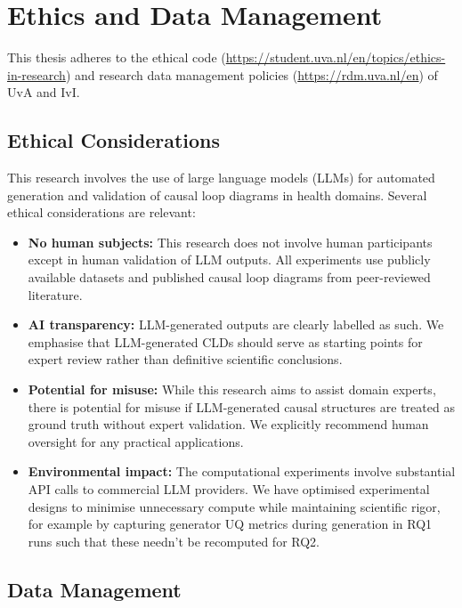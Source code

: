\chapter{Ethics and Data Management}
\label{ch:ethics}

This thesis adheres to the ethical code (\url{https://student.uva.nl/en/topics/ethics-in-research}) and research data management policies (\url{https://rdm.uva.nl/en}) of UvA and IvI.

\section{Ethical Considerations}

This research involves the use of large language models (LLMs) for automated generation and validation of causal loop diagrams in health domains. Several ethical considerations are relevant:

\begin{itemize}
    \item \textbf{No human subjects:} This research does not involve human participants except in human validation of LLM outputs. All experiments use publicly available datasets and published causal loop diagrams from peer-reviewed literature.
    
    \item \textbf{AI transparency:} LLM-generated outputs are clearly labelled as such. We emphasise that LLM-generated CLDs should serve as starting points for expert review rather than definitive scientific conclusions.
    
    \item \textbf{Potential for misuse:} While this research aims to assist domain experts, there is potential for misuse if LLM-generated causal structures are treated as ground truth without expert validation. We explicitly recommend human oversight for any practical applications.
    
    \item \textbf{Environmental impact:} The computational experiments involve substantial API calls to commercial LLM providers. We have optimised experimental designs to minimise unnecessary compute while maintaining scientific rigor, for example by capturing generator UQ metrics during generation in RQ1 runs such that these needn't be recomputed for RQ2.
\end{itemize}

\section{Data Management}

